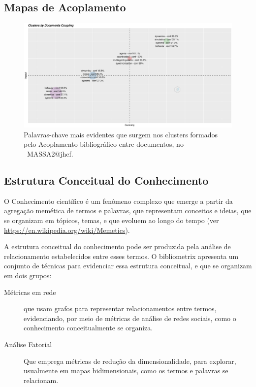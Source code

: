\subsection{Mapas de Acoplamento}

\begin{figure}
    \centering
    \includegraphics[width=1\textwidth]{experiments/jhcf/PesqBibliogr/SimulacaoMultiagente/WoS-20220203/Clustering/MASSA2-CouplingMap-4Labels-Per-Cluster.png}
    \caption{Palavras-chave mais evidentes que surgem nos clusters formados pelo Acoplamento bibliográfico entre documentos, no  \dataset\ MASSA2@jhcf.}
    \label{fig:MASSA2-CouplingMap-4Labels-Per-Cluster}
\end{figure}


\subsection{Estrutura Conceitual do Conhecimento}

O Conhecimento científico é um fenômeno complexo que emerge a partir da agregação memética de termos e palavras, que representam conceitos e ideias, que se organizam em tópicos, temas, e que evoluem ao longo do tempo (ver \url{https://en.wikipedia.org/wiki/Memetics}).

A estrutura conceitual do conhecimento pode ser produzida pela análise de relacionamento estabelecidos entre esses termos. O bibliometrix apresenta um conjunto de técnicas para evidenciar essa estrutura conceitual, e que se organizam em dois grupos:
\begin{description}
    \item [Métricas em rede] que usam grafos para representar relacionamentos entre termos, evidenciando, por meio de métricas de análise de redes sociais, como o conhecimento conceitualmente se organiza.
    \item [Análise Fatorial] Que emprega métricas de redução da dimensionalidade, para explorar, usualmente em mapas bidimensionais, como os termos e palavras se relacionam. 
\end{description}

